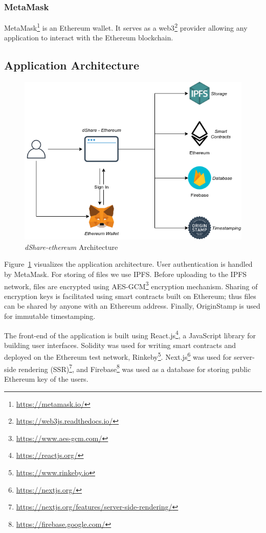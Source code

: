 			\subsubsection{MetaMask}
			MetaMask\footnote{\url{https://metamask.io/}} is an Ethereum wallet. It serves as a web3\footnote{\url{https://web3js.readthedocs.io/}} provider allowing any application to interact with the Ethereum blockchain.
			
		\subsection{Application Architecture}
		
			\begin{figure}[h]
				\includegraphics[width=\linewidth]{figures/dshare-ethereum}
				\caption{\label{fig:dshare-ethereum} \textit{dShare-ethereum} Architecture}
			\end{figure}
			
			Figure~\ref{fig:dshare-ethereum} visualizes the application architecture. User authentication is handled by MetaMask. For storing of files we use IPFS. Before uploading to the IPFS network, files are encrypted using AES-GCM\footnote{\url{https://www.aes-gcm.com/}} encryption mechanism. Sharing of encryption keys is facilitated using smart contracts built on Ethereum; thus files can be shared by anyone with an Ethereum address. Finally, OriginStamp is used for immutable timestamping.
			
			The front-end of the application is built using React.js\footnote{\url{https://reactjs.org/}}, a JavaScript library for building user interfaces. Solidity was used for writing smart contracts and deployed on the Ethereum test network, Rinkeby\footnote{\url{https://www.rinkeby.io}}. Next.js\footnote{\url{https://nextjs.org/}} was used for server-side rendering (SSR)\footnote{\url{https://nextjs.org/features/server-side-rendering/}}, and Firebase\footnote{\url{https://firebase.google.com/}} was used as a database for storing public Ethereum key of the users.
			
